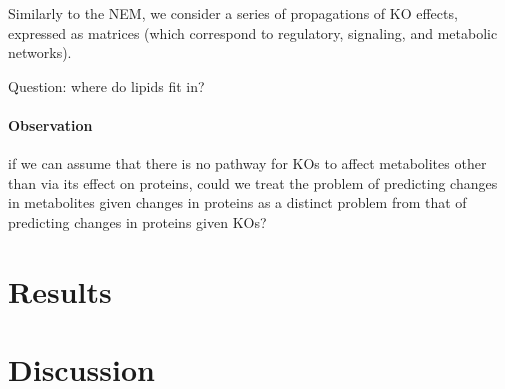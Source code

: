\documentclass{article}
\begin{document}
Similarly to the NEM, we consider a series of propagations of KO effects, expressed as matrices (which correspond to regulatory, signaling, and metabolic networks).


Question: where do lipids fit in?

\paragraph{Observation} if we can assume that there is no pathway for KOs to affect metabolites other than via its effect on proteins, could we treat the problem of predicting changes in metabolites given changes in proteins as a distinct problem from that of predicting changes in proteins given KOs?

\section{Results}

\section{Discussion}

\printbibliography
\end{document}

